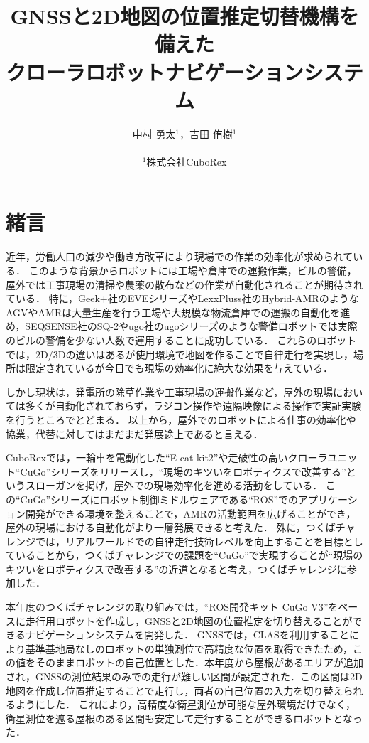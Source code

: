 \documentclass[platex,dvipdfmx]{rbproceedings}
\title{GNSSと2D地図の位置推定切替機構を備えた\\クローラロボットナビゲーションシステム}
\author{%
中村 勇太${}^{1}$，吉田 侑樹${}^{1}$\\ \\
${}^{1}$株式会社CuboRex
}
\begin{document}
\maketitle


\section{緒言}
近年，労働人口の減少や働き方改革により現場での作業の効率化が求められている．
このような背景からロボットには工場や倉庫での運搬作業，ビルの警備，屋外では工事現場の清掃や農薬の散布などの作業が自動化されることが期待されている．
特に，Geek+社のEVEシリーズ\cite{geek_plus}やLexxPluss社のHybrid-AMR\cite{lexxpluss}のようなAGVやAMRは大量生産を行う工場や大規模な物流倉庫での運搬の自動化を進め，SEQSENSE社のSQ-2\cite{seqsense}やugo社のugoシリーズ\cite{ugo}のような警備ロボットでは実際のビルの警備を少ない人数で運用することに成功している．
これらのロボットでは，2D/3Dの違いはあるが使用環境で地図を作ることで自律走行を実現し，場所は限定されているが今日でも現場の効率化に絶大な効果を与えている．

しかし現状は，発電所の除草作業や工事現場の運搬作業など，屋外の現場においては多くが自動化されておらず，ラジコン操作や遠隔映像による操作で実証実験を行うところでとどまる．
以上から，屋外でのロボットによる仕事の効率化や協業，代替に対してはまだまだ発展途上であると言える．

CuboRexでは，一輪車を電動化した“E-cat kit2”\cite{e_cat}や走破性の高いクローラユニット“CuGo”シリーズ\cite{cugo}をリリースし，“現場のキツいをロボティクスで改善する”というスローガンを掲げ，屋外での現場効率化を進める活動をしている．
この“CuGo”シリーズにロボット制御ミドルウェアである“ROS”でのアプリケーション開発ができる環境を整えることで，AMRの活動範囲を広げることができ，屋外の現場における自動化がより一層発展できると考えた．
殊に，つくばチャレンジでは，リアルワールドでの自律走行技術レベルを向上することを目標としていることから，つくばチャレンジでの課題を“CuGo”で実現することが“現場のキツいをロボティクスで改善する”の近道となると考え，つくばチャレンジに参加した．

本年度のつくばチャレンジの取り組みでは，“ROS開発キット CuGo V3”\cite{cugo_ros}をベースに走行用ロボットを作成し，GNSSと2D地図の位置推定を切り替えることができるナビゲーションシステムを開発した．
GNSSでは，CLAS\cite{clas}を利用することにより基準基地局なしのロボットの単独測位で高精度な位置を取得できたため，この値をそのままロボットの自己位置とした．本年度から屋根があるエリアが追加され，GNSSの測位結果のみでの走行が難しい区間が設定された．この区間は2D地図を作成し位置推定することで走行し，両者の自己位置の入力を切り替えられるようにした．
これにより，高精度な衛星測位が可能な屋外環境だけでなく，衛星測位を遮る屋根のある区間も安定して走行することができるロボットとなった．
\end{document}
